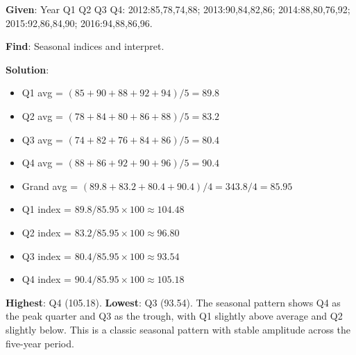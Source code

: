 \documentclass[11pt,a4paper]{article}
\begin{document}
\begin{tcolorbox}[colback=green!5!white,colframe=green!75!black,title=\textbf{Worked Example 21: Seasonal Indices (5-Year Data)}]
\textbf{Given}: Year Q1 Q2 Q3 Q4: 2012:85,78,74,88; 2013:90,84,82,86; 2014:88,80,76,92; 2015:92,86,84,90; 2016:94,88,86,96.

\textbf{Find}: Seasonal indices and interpret.

\textbf{Solution}:
\begin{itemize}
    \item Q1 avg = $(85+90+88+92+94)/5 = 89.8$
    \item Q2 avg = $(78+84+80+86+88)/5 = 83.2$
    \item Q3 avg = $(74+82+76+84+86)/5 = 80.4$
    \item Q4 avg = $(88+86+92+90+96)/5 = 90.4$
    \item Grand avg = $(89.8+83.2+80.4+90.4)/4 = 343.8/4 = 85.95$
    \item Q1 index = $89.8/85.95 \times 100 \approx 104.48$
    \item Q2 index = $83.2/85.95 \times 100 \approx 96.80$
    \item Q3 index = $80.4/85.95 \times 100 \approx 93.54$
    \item Q4 index = $90.4/85.95 \times 100 \approx 105.18$
\end{itemize}
\textbf{Highest}: Q4 (105.18). \textbf{Lowest}: Q3 (93.54). The seasonal pattern shows Q4 as the peak quarter and Q3 as the trough, with Q1 slightly above average and Q2 slightly below. This is a classic seasonal pattern with stable amplitude across the five-year period.
\end{tcolorbox}
\end{document}

